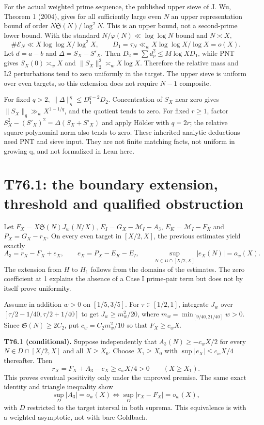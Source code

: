 \documentclass[11pt,a4paper]{article}
\newcommand{\Sg}{\mathfrak S}\newcommand{\e}{\mathrm e}
\begin{document}
For the actual weighted prime sequence, the published upper sieve of J. Wu, Theorem 1 (2004), gives for all sufficiently large even $N$ an upper representation bound of order $N\Sg(N)/\log^2N$. This is an upper bound, not a second-prime lower bound. With the standard $N/\varphi(N)\ll\log\log N$ bound and $N\asymp X$,
\[
 \#\mathcal E_N\ll X\log\log X/\log^2X,\qquad
 D_1=\tau_N\ll_w X\log\log X/\log X=o(X).
\]
Let $d=a-b$ and $\Delta=S_X-S'_X$. Then $D_2=\sum d_p^2\le M\log X D_1$, while PNT gives $S_X(0)\asymp_w X$ and $\|S_X\|_2^2\asymp_w X\log X$. Therefore the relative mass and L2 perturbations tend to zero uniformly in the target. The upper sieve is uniform over even targets, so this extension does not require $N-1$ composite.

For fixed $q>2$, $\|\Delta\|_q^q\le D_1^{q-2}D_2$. Concentration of $S_X$ near zero gives $\|S_X\|_q\gg_w X^{1-1/q}$, and the quotient tends to zero. For fixed $r\ge1$, factor $S_X^2-(S'_X)^2=\Delta(S_X+S'_X)$ and apply H\"older with $q=2r$; the relative square-polynomial norm also tends to zero. These inherited analytic deductions need PNT and sieve input. They are not finite matching facts, not uniform in growing q, and not formalized in Lean here.
\newpage
\section{T76.1: the boundary extension, threshold and qualified obstruction}
Let $F_X=X\Sg(N)J_w(N/X)$, $E_I=G_X-\mathcal M_I-A_3$, $E_K=\mathcal M_I-F_X$ and $P_X=G_X-r_X$. On every even target in $[X/2,X]$, the previous estimates yield exactly
\[
 A_3=r_X-F_X+e_X,\qquad e_X=P_X-E_K-E_I,\qquad
 \sup_{N\in D\cap[X/2,X]}|e_X(N)|=o_w(X).
\]
The extension from $H$ to $H_1$ follows from the domains of the estimates. The zero coefficient at 1 explains the absence of a Case I prime-pair term but does not by itself prove uniformity.

Assume in addition $w>0$ on $[1/5,3/5]$. For $\tau\in[1/2,1]$, integrate $J_w$ over $[\tau/2-1/40,\tau/2+1/40]$ to get $J_w\ge m_w^2/20$, where $m_w=\min_{[9/40,21/40]}w>0$. Since $\Sg(N)\ge2C_2$, put $c_w=C_2m_w^2/10$ so that $F_X\ge c_wX$.

\textbf{T76.1 (conditional).} Suppose independently that $A_3(N)\ge-c_wX/2$ for every $N\in D\cap[X/2,X]$ and all $X\ge X_0$. Choose $X_1\ge X_0$ with $\sup|e_X|\le c_wX/4$ thereafter. Then
\[
 r_X=F_X+A_3-e_X\ge c_wX/4>0\qquad(X\ge X_1).
\]
This proves eventual positivity only under the unproved premise. The same exact identity and triangle inequality show
\[
 \sup_D|A_3|=o_w(X)\iff\sup_D|r_X-F_X|=o_w(X),
\]
with $D$ restricted to the target interval in both suprema. This equivalence is with a weighted asymptotic, not with bare Goldbach.
\end{document}
